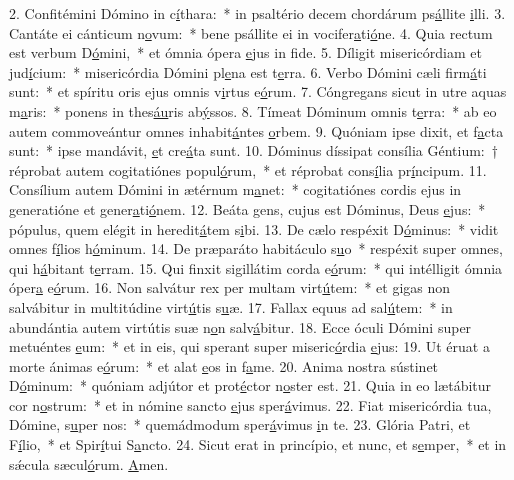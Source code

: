 2. Confitémini Dómino in c\uline{í}thara:~* in psaltério decem chordárum ps\uline{á}llite \uline{i}lli.
3. Cantáte ei cánticum n\uline{o}vum:~* bene psállite ei in vocifer\uline{a}ti\uline{ó}ne.
4. Quia rectum est verbum D\uline{ó}mini,~* et ómnia ópera \uline{e}jus in f\uline{i}de.
5. Díligit misericórdiam et jud\uline{í}cium:~* misericórdia Dómini pl\uline{e}na est t\uline{e}rra.
6. Verbo Dómini cæli firm\uline{á}ti sunt:~* et spíritu oris ejus omnis v\uline{i}rtus e\uline{ó}rum.
7. Cóngregans sicut in utre aquas m\uline{a}ris:~* ponens in thes\uline{áu}ris ab\uline{ý}ssos.
8. Tímeat Dóminum omnis t\uline{e}rra:~* ab eo autem commoveántur omnes inhabit\uline{á}ntes \uline{o}rbem.
9. Quóniam ipse dixit, et f\uline{a}cta sunt:~* ipse mandávit, \uline{e}t cre\uline{á}ta sunt.
10. Dóminus díssipat consília Géntium:~† réprobat autem cogitatiónes popul\uline{ó}rum,~* et réprobat cons\uline{í}lia pr\uline{í}ncipum.
11. Consílium autem Dómini in ætérnum m\uline{a}net:~* cogitatiónes cordis ejus in generatióne et gener\uline{a}ti\uline{ó}nem.
12. Beáta gens, cujus est Dóminus, Deus \uline{e}jus:~* pópulus, quem elégit in heredit\uline{á}tem s\uline{i}bi.
13. De cælo respéxit D\uline{ó}minus:~* vidit omnes f\uline{í}lios h\uline{ó}minum.
14. De præparáto habitáculo s\uline{u}o~* respéxit super omnes, qui h\uline{á}bitant t\uline{e}rram.
15. Qui finxit sigillátim corda e\uline{ó}rum:~* qui intélligit ómnia óper\uline{a} e\uline{ó}rum.
16. Non salvátur rex per multam virt\uline{ú}tem:~* et gigas non salvábitur in multitúdine virt\uline{ú}tis s\uline{u}æ.
17. Fallax equus ad sal\uline{ú}tem:~* in abundántia autem virtútis suæ n\uline{o}n salv\uline{á}bitur.
18. Ecce óculi Dómini super metuéntes \uline{e}um:~* et in eis, qui sperant super miseric\uline{ó}rdia \uline{e}jus:
19. Ut éruat a morte ánimas e\uline{ó}rum:~* et alat \uline{e}os in f\uline{a}me.
20. Anima nostra sústinet D\uline{ó}minum:~* quóniam adjútor et prot\uline{é}ctor n\uline{o}ster est.
21. Quia in eo lætábitur cor n\uline{o}strum:~* et in nómine sancto \uline{e}jus sper\uline{á}vimus.
22. Fiat misericórdia tua, Dómine, s\uline{u}per nos:~* quemádmodum sper\uline{á}vimus \uline{i}n te.
23. Glória Patri, et F\uline{í}lio,~* et Spir\uline{í}tui S\uline{a}ncto.
24. Sicut erat in princípio, et nunc, et s\uline{e}mper,~* et in sǽcula sæcul\uline{ó}rum. \uline{A}men.
